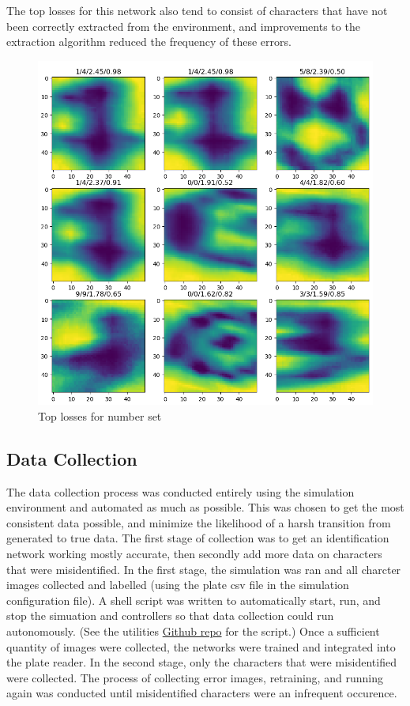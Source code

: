 \documentclass[titlepage, twocolumn]{article}
\begin{document}
The top losses for this network also tend to consist of characters that have not been correctly extracted from the environment, and improvements to the extraction algorithm reduced the frequency of these errors. 

\begin{figure}[H]
    \centering
    \includegraphics[width=0.9\linewidth]{NumTopLoss.png}
    \caption{Top losses for number set}
    \label{fig:numsloss}
\end{figure}

\subsection{Data Collection} \label{platedata}

The data collection process was conducted entirely using the simulation environment and automated as much as possible. This was chosen to get the most consistent data possible, and minimize the likelihood of a harsh transition from generated to true data. The first stage of collection was to get an identification network working mostly accurate, then secondly add more data on characters that were misidentified. In the first stage, the simulation was ran and all charcter images collected and labelled (using the plate csv file in the simulation configuration file). A shell script was written to automatically start, run, and stop the simuation and controllers so that data collection could run autonomously. (See the utilities \href{https://github.com/nvanrumpt/robot_controller_utils2/blob/master/scripts/repeat_runsim.sh}{Github repo} for the script.) Once a sufficient quantity of images were collected, the networks were trained and integrated into the plate reader. In the second stage, only the characters that were misidentified were collected. The process of collecting error images, retraining, and running again was conducted until misidentified characters were an infrequent occurence.
\end{document}
